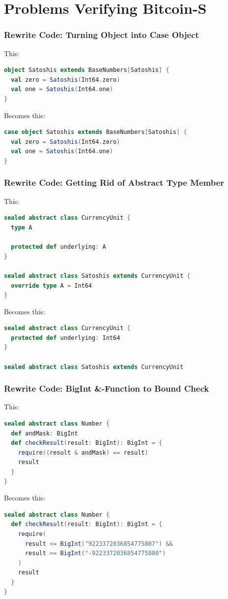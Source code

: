 \documentclass{beamer}
\begin{document}
\section{Problems Verifying Bitcoin-S}


\begin{frame}[fragile]
\frametitle{Rewrite Code: Turning Object into Case Object}
This:
\begin{lstlisting}[language=Scala]
object Satoshis extends BaseNumbers[Satoshis] {
  val zero = Satoshis(Int64.zero)
  val one = Satoshis(Int64.one)
}
\end{lstlisting}

Becomes this:
\begin{lstlisting}[language=Scala]
case object Satoshis extends BaseNumbers[Satoshis] {
  val zero = Satoshis(Int64.zero)
  val one = Satoshis(Int64.one)
}
\end{lstlisting}
\end{frame}


\begin{frame}[fragile]
\frametitle{Rewrite Code: Getting Rid of Abstract Type Member}
This:
\begin{lstlisting}[language=Scala]
sealed abstract class CurrencyUnit {
  type A

  protected def underlying: A
}

sealed abstract class Satoshis extends CurrencyUnit {
  override type A = Int64
}
\end{lstlisting}

Becomes this:
\begin{lstlisting}[language=Scala]
sealed abstract class CurrencyUnit {
  protected def underlying: Int64
}

sealed abstract class Satoshis extends CurrencyUnit
\end{lstlisting}
\end{frame}


\begin{frame}[fragile]
\frametitle{Rewrite Code: BigInt \&-Function to Bound Check}
This:
\begin{lstlisting}[language=Scala]
sealed abstract class Number {
  def andMask: BigInt
  def checkResult(result: BigInt): BigInt = {
    require((result & andMask) == result)
    result
  }
}  
\end{lstlisting}
Becomes this:
\begin{lstlisting}[language=Scala]
sealed abstract class Number {
  def checkResult(result: BigInt): BigInt = {
    require(
      result <= BigInt("9223372036854775807") &&
      result >= BigInt("-9223372036854775808")
    )
    result
  }
}
\end{lstlisting}
\end{frame}
\end{document}
